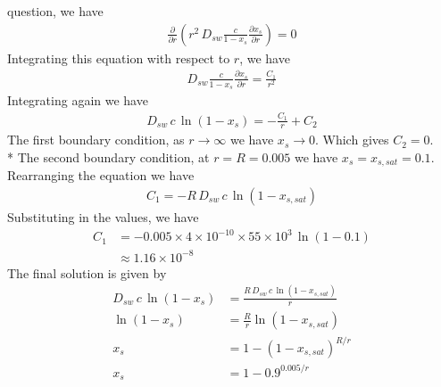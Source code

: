 \documentclass[calculator,datasheet,handbook]{exam}
\begin{document}
\begin{question}
\begin{enumerate}[a)]
\begin{enumerate}[i)]
{        question, we have
        \begin{align*}
          \frac{\partial }{\partial r}
          \left(r^2\,D_{sw}\frac{c}{1-x_s}\frac{\partial x_s}{\partial
              r}\right) = 0
        \end{align*}
        Integrating this equation with respect to $r$, we have
        \begin{align*}
          D_{sw}\frac{c}{1-x_s}\frac{\partial x_s}{\partial r} =
          \frac{C_1}{r^2}
        \end{align*}
        Integrating again we have
        \begin{align*}
          D_{sw}\,c\,\ln \left(1 - x_s\right) = -\frac{C_1}{r} + C_2
        \end{align*}
        The first boundary condition, as $r\to\infty$ we have
        $x_s\to0$. Which gives $C_2 = 0$.%
        \\*
        The second boundary condition, at $r=R=0.005$ we have $x_s =
        x_{s,sat}=0.1$. Rearranging the equation we have
        \begin{align*}
          C_1 = -R\,D_{sw}\,c\,\ln \left(1 - x_{s,sat}\right)
        \end{align*}
        Substituting in the values, we have
        \begin{align*}
          C_1 &= -0.005\times4\times10^{-10}\times55\times10^3\,\ln \left(1 - 0.1\right)\\
          &\approx 1.16\times10^{-8}
        \end{align*}
        The final solution is given by
        \begin{align*}
          D_{sw}\,c\,\ln \left(1 - x_s\right) &= \frac{R\,D_{sw}\,c\,\ln \left(1 - x_{s,sat}\right)}{r}\\
          \ln \left(1 - x_s\right) &= \frac{R}{r}\ln \left(1 - x_{s,sat}\right)\\
          x_s &= 1-\left(1 - x_{s,sat}\right)^{R/r}\\
          x_s &= 1-0.9^{0.005/r}
        \end{align*}
      }
    \end{enumerate}
  \end{enumerate}
\end{question}
\end{document}
